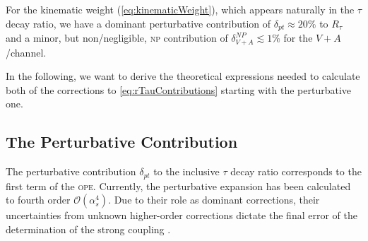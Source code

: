 \documentclass[../../index.tex]{subfiles}
\begin{document}
For the kinematic weight (\cref{eq:kinematicWeight}), which appears naturally in
the \(\tau\) decay ratio, we have a dominant perturbative contribution of
\(\delta_{pt} \approx 20\%\) to \(R_\tau\) \cite{Pich2013} and a minor, but
non\-/negligible, \textsc{np} contribution of \(\delta_{V+A}^{NP} \lesssim 1\%
\) \cite{Jamin2013} for the \(V+A\)\-/channel.

In the following, we want to derive the theoretical expressions needed to
calculate both of the corrections to \cref{eq:rTauContributions} starting with
the perturbative one.


\subsection{The Perturbative Contribution}
The perturbative contribution \(\delta_{pt}\) to the inclusive \(\tau\) decay
ratio corresponds to the first term of the \textsc{ope}. Currently, the
perturbative expansion has been calculated to fourth order
\(\mathcal{O}(\alpha_s^4)\). Due to their role as dominant corrections, their
uncertainties from unknown higher-order corrections dictate the final error of
the determination of the strong coupling \cite{Pich2016}.
\end{document}
